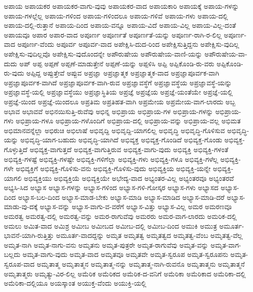 {ಅಪಾಯ
ಅಪಾಯಕರ
ಅಪಾಯಕರ-ವಾಗು-ವುವು
ಅಪಾಯಕರ-ವಾದ
ಅಪಾಯಕಾರಿ
ಅಪಾಯಕ್ಕೆ
ಅಪಾಯ-ಗಳನ್ನು
ಅಪಾಯ-ಗಳಲ್ಲೆಲ್ಲ
ಅಪಾಯ-ಗಳಿಂದ
ಅಪಾಯ-ಗಳಿಂದಲೂ
ಅಪಾಯ-ಗಳಿವೆ
ಅಪಾಯ-ಗಳು
ಅಪಾಯ-ದಲ್ಲಿ
ಅಪಾಯ-ದಲ್ಲಿ-ರುತ್ತಾನೆ
ಅಪಾಯ-ದಿಂದ
ಅಪಾಯ-ವನ್ನೂ
ಅಪಾಯ-ವಿದೆ
ಅಪಾಯ-ವಿಲ್ಲ
ಅಪಾಯ-ವಿಲ್ಲ-ದಂತೆ
ಅಪಾಯವೂ
ಅಪಾರ
ಅಪಾರ-ವಾದ
ಅಪೂರ್ಣ
ಅಪೂರ್ಣತೆ
ಅಪೂರ್ಣತೆ-ಯನ್ನು
ಅಪೂರ್ಣ-ರಾಗಿ-ರ-ಲಿಲ್ಲ
ಅಪೂರ್ಣ-ವಾದ
ಅಪೂರ್ಣ-ವೆಂದು
ಅಪೂರ್ವ
ಅಪೂರ್ವ-ವಾದ
ಅಪೇಕ್ಷಿಸಿ-ದುದ-ರಿಂದ
ಅಪೇಕ್ಷಿಸುತ್ತಿದ್ದನು
ಅಪೇಕ್ಷಿಸು-ವುದಿಲ್ಲ
ಅಪೇಕ್ಷಿಸು-ವುದಿಲ್ಲವೊ
ಅಪೇಕ್ಷಿಸು-ವುದೊಂದನ್ನೇ
ಅಪೌರುಷೇಯ
ಅಪೌರುಷೇಯ-ವಾಣಿ-ಯನ್ನು
ಅಪೌರುಷೇಯ-ವಾ-ದುದು
ಅಪ್
ಅಪ್ಪ
ಅಪ್ಪಣೆ
ಅಪ್ಪಣೆ-ಮಾಡುತ್ತೇನೆ
ಅಪ್ಪಣೆ-ಯನ್ನು
ಅಪ್ಪಳಿಸಿ
ಅಪ್ಪಿ
ಅಪ್ಪಿಕೊಂಡಿ-ರು-ವರು
ಅಪ್ಪಿಕೊಂಡಿ-ರು-ವುದು
ಅಪ್ಪಿದ್ದ
ಅಪ್ಪುತ್ತೇವೆ
ಅಪ್ಪುವ
ಅಪ್ರಜ್ಞಾ
ಅಪ್ರಜ್ಞಾತ್ಮಕ
ಅಪ್ರಜ್ಞಾತ್ಮಕ-ವಾದ
ಅಪ್ರಜ್ಞಾಪೂರ್ವಕ-ವಾಗಿ
ಅಪ್ರಜ್ಞಾಪೂರ್ವಕ-ವಾಗಿದೆ
ಅಪ್ರಜ್ಞಾಪೂರ್ವಕ-ವಾಗಿ-ರುವ
ಅಪ್ರಜ್ಞಾವಸ್ಥೆಗೆ
ಅಪ್ರಜ್ಞಾವಸ್ಥೆಯ
ಅಪ್ರಜ್ಞಾವಸ್ಥೆ-ಯನ್ನು
ಅಪ್ರಜ್ಞಾವಸ್ಥೆ-ಯಲ್ಲಿ
ಅಪ್ರಜ್ಞಾವಸ್ಥೆಯು
ಅಪ್ರಜ್ಞಾಸ್ಥಿತಿಯ
ಅಪ್ರಜ್ಞೆ
ಅಪ್ರಜ್ಞೆಯ
ಅಪ್ರಜ್ಞೆ-ಯಂತೆಯೇ
ಅಪ್ರಜ್ಞೆ-ಯಲ್ಲಿ
ಅಪ್ರಜ್ಞೆ-ಯಿಂದ
ಅಪ್ರಜ್ಞೆ-ಯಿಂದಲೂ
ಅಪ್ರತಿಮ
ಅಪ್ರತಿಹತ-ವಾಗಿ
ಅಪ್ರಮೇಯ
ಅಪ್ರಮೇಯ-ವಾಗ-ಲಾರದು
ಅಬ್ಬ
ಅಭಾವ
ಅಭಾವವೆ
ಅಭಿನಯಿಸುತ್ತಿ-ರುವೆವು
ಅಭಿನ್ನ
ಅಭಿಪ್ರಾಯ
ಅಭಿಪ್ರಾಯ-ಗಳ
ಅಭಿಪ್ರಾಯ-ಗಳನ್ನು
ಅಭಿಪ್ರಾಯ-ಗಳು
ಅಭಿಪ್ರಾಯ-ಗಳೂ
ಅಭಿಪ್ರಾಯ-ಗಳೊಂದಿಗೆ
ಅಭಿಪ್ರಾಯ-ದಲ್ಲಿ
ಅಭಿಪ್ರಾಯ-ವನ್ನು
ಅಭಿಪ್ರಾಯ-ವಲ್ಲ
ಅಭಿಮತ
ಅಭಿಮಾನವನ್ನೆಲ್ಲಾ
ಅಭಿರುಚಿ
ಅಭಿಲಾಷೆ
ಅಭಿವೃದ್ದಿ
ಅಭಿವೃದ್ದಿ-ಯಾಗಲಿಲ್ಲ
ಅಭಿವೃದ್ಧಿ
ಅಭಿವೃದ್ಧಿ-ಗೊಳಿಸುವ
ಅಭಿವೃದ್ಧಿ-ಯನ್ನು
ಅಭಿವೃದ್ಧಿ-ಯಾಗ-ಬಹುದು
ಅಭಿವೃದ್ಧಿ-ಯಾಗಿದೆ
ಅಭಿವ್ಯಕ್ತ
ಅಭಿವ್ಯಕ್ತ-ಗೊಂಡಿದೆ
ಅಭಿವ್ಯಕ್ತ-ಗೊಂಡು
ಅಭಿವ್ಯಕ್ತ-ಗೊಳ್ಳುತ್ತಿದೆ
ಅಭಿವ್ಯಕ್ತ-ವಾಗುತ್ತದೆ
ಅಭಿವ್ಯಕ್ತ-ವಾಗುತ್ತಿರುವ
ಅಭಿವ್ಯಕ್ತ-ವಾಗು-ವುದು
ಅಭಿವ್ಯಕ್ತಿ
ಅಭಿವ್ಯಕ್ತಿ-ಗಳಂತೆ
ಅಭಿವ್ಯಕ್ತಿ-ಗಳಷ್ಟೆ
ಅಭಿವ್ಯಕ್ತಿ-ಗಳಷ್ಟೇ
ಅಭಿವ್ಯಕ್ತಿ-ಗಳಿಗೆಲ್ಲಾ
ಅಭಿವ್ಯಕ್ತಿ-ಗಳು
ಅಭಿವ್ಯಕ್ತಿ-ಗಳೂ
ಅಭಿವ್ಯಕ್ತಿ-ಗಳೆಲ್ಲ
ಅಭಿವ್ಯಕ್ತಿ-ಗಳೇ
ಅಭಿವ್ಯಕ್ತಿಗೆ
ಅಭಿವ್ಯಕ್ತಿ-ಗೊಳಿಸು-ವನು
ಅಭಿವ್ಯಕ್ತಿ-ಗೊಳಿಸು-ವುದು
ಅಭಿವ್ಯಕ್ತಿಯ
ಅಭಿವ್ಯಕ್ತಿ-ಯನ್ನೇ
ಅಭಿವ್ಯಕ್ತಿ-ಯಾಗಲಿ
ಅಭಿವ್ಯಕ್ತಿಯು
ಅಭಿವ್ಯಕ್ತಿಯೆ
ಅಭಿವ್ಯಕ್ತಿಯೇ
ಅಭೇದ್ಯ-ವಾದ
ಅಭ್ಯಂತರ-ವಿಲ್ಲ
ಅಭ್ಯಂತರವೂ
ಅಭ್ಯಂತರವೆ
ಅಭ್ಯಸಿ-ಸಿದ
ಅಭ್ಯಾಸ
ಅಭ್ಯಾಸ-ಗಳನ್ನು
ಅಭ್ಯಾಸ-ಗಳಿಂದ
ಅಭ್ಯಾಸ-ಗಳಿ-ಗೋಸ್ಕರ
ಅಭ್ಯಾಸ-ಗಳು
ಅಭ್ಯಾಸದ
ಅಭ್ಯಾಸ-ದಿಂದ
ಅಭ್ಯಾಸ-ಬಲ-ದಿಂದ
ಅಭ್ಯಾಸ-ಮಾಡ-ಬೇಕು
ಅಭ್ಯಾಸ-ಮಾಡಿ
ಅಭ್ಯಾಸ-ಮಾಡಿದ
ಅಭ್ಯಾಸ-ಮಾಡಿ-ದರೆ
ಅಭ್ಯಾಸ-ಮಾಡು-ವು-ದಕ್ಕೆ
ಅಭ್ಯಾಸ-ವನ್ನು
ಅಭ್ಯಾಸ-ವಾಗು-ವ-ವರೆಗೆ
ಅಭ್ಯಾಸ-ವಿತ್ತು
ಅಭ್ಯಾಸ-ವಿಲ್ಲ
ಅಮರ
ಅಮರಣವೂ
ಅಮರತ್ವ
ಅಮರತ್ವ-ದಲ್ಲಿ
ಅಮರತ್ವ-ವನ್ನು
ಅಮರ-ರಾಗುವೆವು
ಅಮರರು
ಅಮರ-ವಾಗ-ಲಾರದು
ಅಮರಿಕ-ದಲ್ಲಿ
ಅಮಲು
ಅಮಿತ-ವಾದ
ಅಮಿಶ್ರ
ಅಮೀಬ
ಅಮೀಬದ
ಅಮೀಬ-ದಲ್ಲಿ
ಅಮೀಬ-ದಿಂದ
ಅಮುಕಿ
ಅಮುತ್ರ
ಅಮೂರ್ತ-ಭಾವನೆ-ಯಾಗಿ-ರುತ್ತಿತ್ತು
ಅಮೂರ್ತ-ವಾದದ್ದನ್ನು
ಅಮೃತ
ಅಮೃತತ್ವ
ಅಮೃತತ್ವದ
ಅಮೃತತ್ವ-ವೆಂಬ
ಅಮೃತತ್ವ-ವೆಲ್ಲ
ಅಮೃತ-ನಾಗಿ
ಅಮೃತ-ನಾಗು-ವನು
ಅಮೃತನು
ಅಮೃತ-ಪುತ್ರರೇ
ಅಮೃತ-ರಾಗುವೆವು
ಅಮೃತ-ವನ್ನು
ಅಮೃತ-ವಾಗ-ಬಲ್ಲದು
ಅಮೃತ-ವಾಗು-ವುದು
ಅಮೃತ-ವಾದ
ಅಮೃತವೂ
ಅಮೃತವೇ
ಅಮೃತ-ಸ್ವರೂಪ
ಅಮೃತ-ಸ್ವರೂಪನು
ಅಮೃತ-ಸ್ವರೂಪ-ವಾದ
ಅಮೃತಾತ್ಮ
ಅಮೃತಾತ್ಮನ
ಅಮೃತಾತ್ಮ-ನನ್ನು
ಅಮೃತಾತ್ಮ-ನಾಗಿ-ರುವನೊ
ಅಮೃತಾತ್ಮನು
ಅಮೃತಾತ್ಮನೆ
ಅಮೃತಾತ್ಮರು
ಅಮೃತ್ಯು-ವಿರ-ಲಿಲ್ಲ
ಅಮೆರಿಕ
ಅಮೆರಿಕದ
ಅಮೆರಿಕ-ದ-ವನಿಗೆ
ಅಮೆರಿಕಾ
ಅಮೆರಿಕಾದ
ಅಮೆರಿಕಾ-ದಲ್ಲಿ
ಅಮೆರಿಕಾ-ದಲ್ಲಿಯೂ
ಅಯಸ್ಕಾಂತ
ಅಯುಕ್ತ-ವೆಂದು
ಅಯುಕ್ತಿ-ಯಲ್ಲಿ
}
